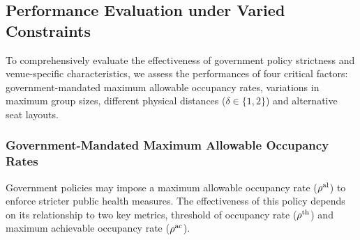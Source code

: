 
\subsection{Performance Evaluation under Varied Constraints}\label{perf_constraints}
To comprehensively evaluate the effectiveness of government policy strictness and venue-specific characteristics, we assess the performances of four critical factors: government-mandated maximum allowable occupancy rates, variations in maximum group sizes, different physical distances ($\delta \in \{1,2\}$) and alternative seat layouts.


\subsubsection{Government-Mandated Maximum Allowable Occupancy Rates}

Government policies may impose a maximum allowable occupancy rate ($\rho^{\textup{al}}$) to enforce stricter public health measures. The effectiveness of this policy depends on its relationship to two key metrics, threshold of occupancy rate ($\rho^{\textup{th}}$) and maximum achievable occupancy rate ($\rho^{\textup{ac}}$).

